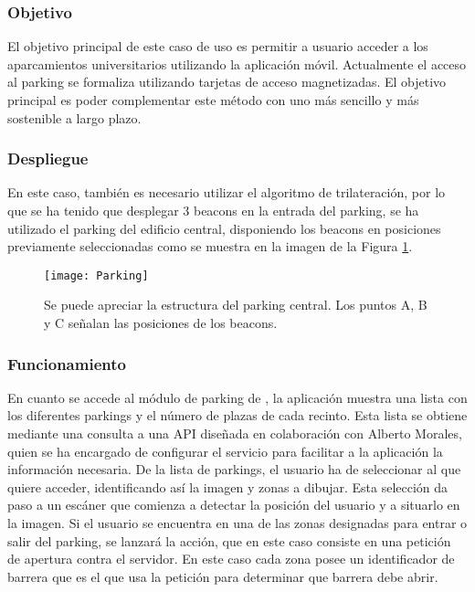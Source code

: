 \subsubsection{Objetivo}

El objetivo principal de este caso de uso es permitir a usuario acceder a los aparcamientos universitarios utilizando la aplicación móvil. Actualmente el acceso al parking se formaliza utilizando tarjetas de acceso magnetizadas. El objetivo principal es poder complementar este método con uno más sencillo y más sostenible a largo plazo. 

\subsubsection{Despliegue}

En este caso, también es necesario utilizar el algoritmo de trilateración, por lo que se ha tenido que desplegar 3 beacons en la entrada del parking, se ha utilizado el parking del edificio central, disponiendo los beacons en posiciones previamente seleccionadas como se muestra en la imagen de la Figura \ref{fig:parking}.

\begin{figure}[H]
	\centering
	\texttt{[image: Parking]}
	\label{fig:parking}
	\caption{Se puede apreciar la estructura del parking central. Los puntos A, B y C señalan las posiciones de los beacons.}
\end{figure}

\subsubsection{Funcionamiento}


En cuanto se accede al módulo de parking de \BulletPoint{}, la aplicación muestra una lista con los diferentes parkings y el número de plazas de cada recinto. Esta lista se obtiene mediante una consulta a una API diseñada en colaboración con Alberto Morales, quien se ha encargado de configurar el servicio para facilitar a la aplicación la información necesaria. De la lista de parkings, el usuario ha de seleccionar al que quiere acceder, identificando así la imagen y zonas a dibujar. Esta selección da paso a un escáner que comienza a detectar la posición del usuario y a situarlo en la imagen. Si el usuario se encuentra en una de las zonas designadas para entrar o salir del parking, se lanzará la acción, que en este caso consiste en una petición de apertura contra el servidor. En este caso cada zona posee un identificador de barrera que es el que usa la petición para determinar que barrera debe abrir. 


